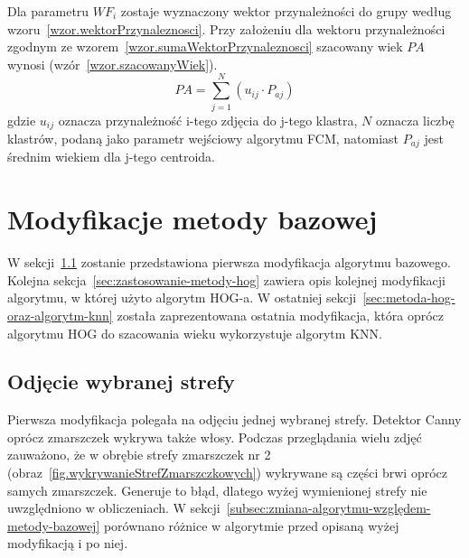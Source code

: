 \documentclass[a4paper,twoside,12pt]{book}
\begin{document}


    Dla parametru $WF_{i}$ zostaje wyznaczony wektor przynależności do grupy
    według wzoru~\ref{wzor.wektorPrzynaleznosci}.
    Przy założeniu dla wektoru przynależności zgodnym ze wzorem~\ref{wzor.sumaWektorPrzynaleznosci} szacowany wiek
    $PA$
    wynosi
    (wzór~\ref{wzor.szacowanyWiek}).
    \large
    \begin{equation}
        PA=\sum_{j=1}^{N}(u_{ij} \cdot P_{aj})
        \label{wzor.szacowanyWiek}
    \end{equation}
    \normalsize
    gdzie $u_{ij}$ oznacza przynależność i-tego zdjęcia do j-tego klastra, $N$ oznacza liczbę klastrów, podaną jako
    parametr wejściowy algorytmu FCM,
    natomiast $P_{aj}$ jest średnim wiekiem dla j-tego centroida.

    \chapter{Modyfikacje metody bazowej}\label{ch:modyfikacje-metody-bazowej}
    W sekcji~\ref{sec:odjęcie-wybranej-strefy} zostanie przedstawiona pierwsza modyfikacja algorytmu bazowego.
    Kolejna sekcja~\ref{sec:zastosowanie-metody-hog} zawiera opis kolejnej modyfikacji algorytmu, w której użyto
    algorytm HOG-a.
    W ostatniej sekcji~\ref{sec:metoda-hog-oraz-algorytm-knn} została zaprezentowana ostatnia modyfikacja, która oprócz algorytmu HOG do szacowania
    wieku wykorzystuje algorytm KNN.

    \section{Odjęcie wybranej strefy}\label{sec:odjęcie-wybranej-strefy}
    Pierwsza modyfikacja polegała na odjęciu jednej wybranej strefy. Detektor Canny oprócz zmarszczek
    wykrywa także włosy. Podczas przeglądania wielu zdjęć zauważono, że w obrębie
    strefy zmarszczek nr 2 (obraz~\ref{fig.wykrywanieStrefZmarszczkowych}) wykrywane są części brwi oprócz samych
    zmarszczek. Generuje to błąd, dlatego wyżej wymienionej strefy nie uwzględniono w obliczeniach.
    W sekcji~\ref{subsec:zmiana-algorytmu-względem-metody-bazowej} porównano różnice w algorytmie przed opisaną wyżej
    modyfikacją i po niej.
\end{document}

